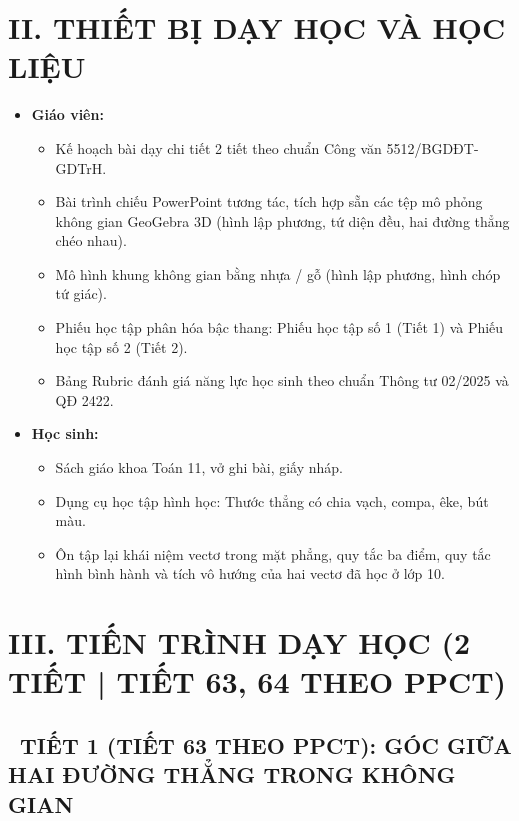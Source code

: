 \documentclass[12pt, a4paper]{article}
\begin{document}
\vspace{5pt}

\section*{II. THIẾT BỊ DẠY HỌC VÀ HỌC LIỆU}

\begin{itemize}[leftmargin=1.2cm]
    \item \textbf{Giáo viên:}
    \begin{itemize}[leftmargin=0.6cm]
        \item Kế hoạch bài dạy chi tiết 2 tiết theo chuẩn Công văn 5512/BGDĐT-GDTrH.
        \item Bài trình chiếu PowerPoint tương tác, tích hợp sẵn các tệp mô phỏng không gian GeoGebra 3D (hình lập phương, tứ diện đều, hai đường thẳng chéo nhau).
        \item Mô hình khung không gian bằng nhựa / gỗ (hình lập phương, hình chóp tứ giác).
        \item Phiếu học tập phân hóa bậc thang: Phiếu học tập số 1 (Tiết 1) và Phiếu học tập số 2 (Tiết 2).
        \item Bảng Rubric đánh giá năng lực học sinh theo chuẩn Thông tư 02/2025 và QĐ 2422.
    \end{itemize}
    \item \textbf{Học sinh:}
    \begin{itemize}[leftmargin=0.6cm]
        \item Sách giáo khoa Toán 11, vở ghi bài, giấy nháp.
        \item Dụng cụ học tập hình học: Thước thẳng có chia vạch, compa, êke, bút màu.
        \item Ôn tập lại khái niệm vectơ trong mặt phẳng, quy tắc ba điểm, quy tắc hình bình hành và tích vô hướng của hai vectơ đã học ở lớp 10.
    \end{itemize}
\end{itemize}

\vspace{5pt}

\section*{III. TIẾN TRÌNH DẠY HỌC (2 TIẾT | TIẾT 63, 64 THEO PPCT)}

\subsection*{\faClockO \ TIẾT 1 (TIẾT 63 THEO PPCT): GÓC GIỮA HAI ĐƯỜNG THẲNG TRONG KHÔNG GIAN}
\end{document}
